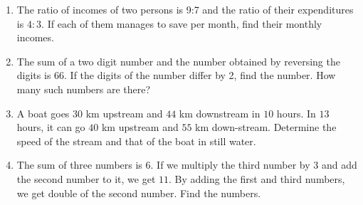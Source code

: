 \begin{enumerate}[label=\thesubsection.\arabic*, ref=\thesubsection.\theenumi]
\item The ratio of incomes of two persons is 9:7 and the ratio of their expenditures is $4:3$. If each of them manages to save  per month, find their monthly incomes.
\item The sum of a two digit number and the number obtained by reversing the digits is $66$. If the digits of the number differ by 2, find the number. How many such numbers are there?
\item A boat goes $30$ km upstream and $44$ km downstream in $10$ hours. In $13$ hours, it can go $40$ km upstream and $55$ km down-stream. Determine the speed of the stream and that of the boat in still water.
\item The sum of three numbers is $6$. If we multiply the third number by $3$ and add the second number to it, we get $11$. By adding the first and third numbers, we get double of the second number. Find the numbers. 
\end{enumerate}
